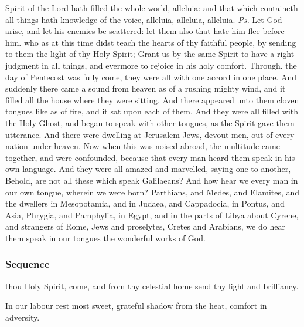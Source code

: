 \introit
{} Spirit of the Lord hath filled the whole world, alleluia: and that which containeth all things hath knowledge of the voice, alleluia, alleluia, alleluia. \textit{Ps.} Let God arise, and let his enemies be scattered: let them also that hate him flee before him.
\collect
{} who as at this time didst teach the hearts of thy faithful people, by sending to them the light of thy Holy Spirit; Grant us by the same Spirit to have a right judgment in all things, and evermore to rejoice in his holy comfort. Through.
 the day of Pentecost was fully come, they were all with one accord in one place. And suddenly there came a sound from heaven as of a rushing mighty wind, and it filled all the house where they were sitting. And there appeared unto them cloven tongues like as of fire, and it sat upon each of them. And they were all filled with the Holy Ghost, and began to speak with other tongues, as the Spirit gave them utterance. And there were dwelling at Jerusalem Jews, devout men, out of every nation under heaven. Now when this was noised abroad, the multitude came together, and were confounded, because that every man heard them speak in his own language. And they were all amazed and marvelled, saying one to another, Behold, are not all these which speak Galilaeans? And how hear we every man in our own tongue, wherein we were born? Parthians, and Medes, and Elamites, and the dwellers in Mesopotamia, and in Judaea, and Cappadocia, in Pontus, and Asia, Phrygia, and Pamphylia, in Egypt, and in the parts of Libya about Cyrene, and strangers of Rome, Jews and proselytes, Cretes and Arabians, we do hear them speak in our tongues the wonderful works of God.
\subsubsection{Sequence}\label{WhitSeq}
 thou Holy Spirit, come, and from thy celestial home send thy light and brilliancy.

In our labour rest most sweet, grateful shadow from the heat, comfort in adversity.

